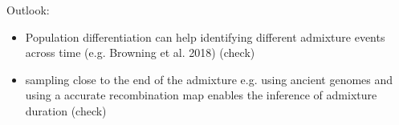 Outlook:

\begin{itemize}
  \item Population differentiation can help identifying different admixture events across time (e.g. Browning et al. 2018) (check)
  \item sampling close to the end of the admixture e.g. using ancient genomes and using a accurate recombination map enables the inference of admixture duration (check)
  
\end{itemize}